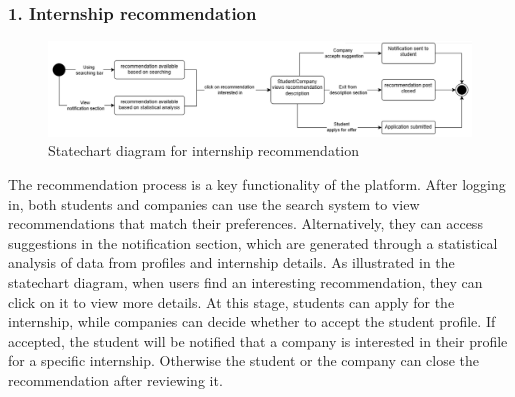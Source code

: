 \subsubsection{1. Internship recommendation}\label{subsubsec:internship_application}
\begin{figure}[H]
    \centering
    \includegraphics[width=1\textwidth]{Images/Internship_recommendation.png}
    \caption{Statechart diagram for internship recommendation}\label{fig:statechart_internship_recommendation}
\end{figure}
The recommendation process is a key functionality of the platform. After logging in, both students and companies can use the search system to view 
recommendations that match their preferences. Alternatively, they can access suggestions in the notification section, which are generated through
a statistical analysis of data from profiles and internship details. As illustrated in the statechart diagram, when users find an interesting 
recommendation, they can click on it to view more details. At this stage, students can apply for the internship, while companies can decide whether
to accept the student profile. If accepted, the student will be notified that a company is interested in their profile for a specific internship. 
Otherwise the student or the company can close the recommendation after reviewing it.

